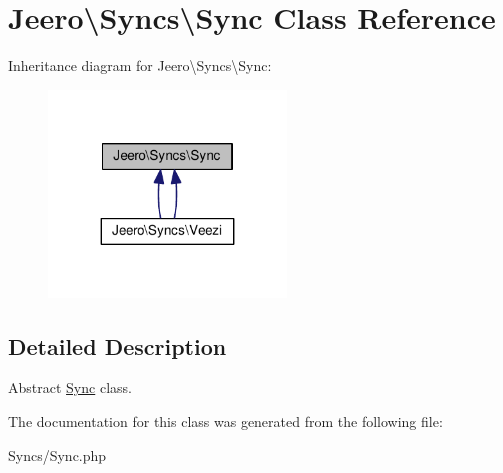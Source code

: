\hypertarget{classJeero_1_1Syncs_1_1Sync}{}\section{Jeero\textbackslash{}Syncs\textbackslash{}Sync Class Reference}
\label{classJeero_1_1Syncs_1_1Sync}


Inheritance diagram for Jeero\textbackslash{}Syncs\textbackslash{}Sync\+:\nopagebreak
\begin{figure}[H]
\begin{center}
\leavevmode
\includegraphics[width=179pt]{classJeero_1_1Syncs_1_1Sync__inherit__graph}
\end{center}
\end{figure}


\subsection{Detailed Description}
Abstract \hyperlink{classJeero_1_1Syncs_1_1Sync}{Sync} class.

The documentation for this class was generated from the following file\+:\begin{DoxyCompactItemize}
\item 
Syncs/Sync.\+php\end{DoxyCompactItemize}
